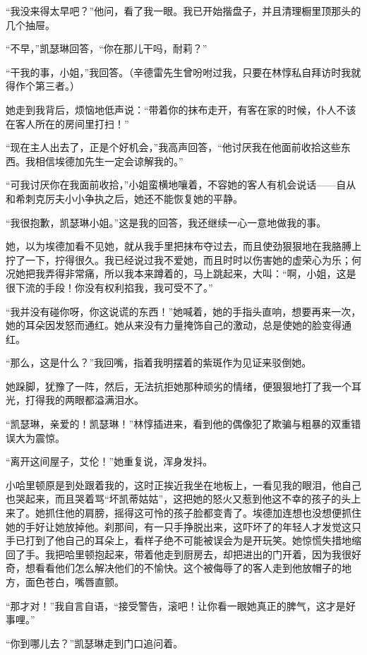 \par “我没来得太早吧？”他问，看了我一眼。我已开始揩盘子，并且清理橱里顶那头的几个抽屉。
\par “不早，”凯瑟琳回答，“你在那儿干吗，耐莉？”
\par “干我的事，小姐，”我回答。（辛德雷先生曾吩咐过我，只要在林惇私自拜访时我就得作个第三者。）
\par 她走到我背后，烦恼地低声说：“带着你的抹布走开，有客在家的时候，仆人不该在客人所在的房间里打扫！”
\par “现在主人出去了，正是个好机会，”我高声回答，“他讨厌我在他面前收拾这些东西。我相信埃德加先生一定会谅解我的。”
\par “可我讨厌你在我面前收拾，”小姐蛮横地嚷着，不容她的客人有机会说话——自从和希刺克厉夫小小争执之后，她还不能恢复她的平静。
\par “我很抱歉，凯瑟琳小姐。”这是我的回答，我还继续一心一意地做我的事。
\par 她，以为埃德加看不见她，就从我手里把抹布夺过去，而且使劲狠狠地在我胳膊上拧了一下，拧得很久。我已经说过我不爱她，而且时时以伤害她的虚荣心为乐；何况她把我弄得非常痛，所以我本来蹲着的，马上跳起来，大叫：“啊，小姐，这是很下流的手段！你没有权利掐我，我可受不了。”
\par “我并没有碰你呀，你这说谎的东西！”她喊着，她的手指头直响，想要再来一次，她的耳朵因发怒而通红。她从来没有力量掩饰自己的激动，总是使她的脸变得通红。
\par “那么，这是什么？”我回嘴，指着我明摆着的紫斑作为见证来驳倒她。
\par 她跺脚，犹豫了一阵，然后，无法抗拒她那种顽劣的情绪，便狠狠地打了我一个耳光，打得我的两眼都溢满泪水。
\par “凯瑟琳，亲爱的！凯瑟琳！”林惇插进来，看到他的偶像犯了欺骗与粗暴的双重错误大为震惊。
\par “离开这间屋子，艾伦！”她重复说，浑身发抖。
\par 小哈里顿原是到处跟着我的，这时正挨近我坐在地板上，一看见我的眼泪，他自己也哭起来，而且哭着骂“坏凯蒂姑姑”，这把她的怒火又惹到他这不幸的孩子的头上来了。她抓住他的肩膀，摇得这可怜的孩子脸都变青了。埃德加连想也没想便抓住她的手好让她放掉他。刹那间，有一只手挣脱出来，这吓坏了的年轻人才发觉这只手已打到了他自己的耳朵上，看样子绝不可能被误会为是开玩笑。她惊慌失措地缩回了手。我把哈里顿抱起来，带着他走到厨房去，却把进出的门开着，因为我很好奇，想看看他们怎么解决他们的不愉快。这个被侮辱了的客人走到他放帽子的地方，面色苍白，嘴唇直颤。
\par “那才对！”我自言自语，“接受警告，滚吧！让你看一眼她真正的脾气，这才是好事哩。”
\par “你到哪儿去？”凯瑟琳走到门口追问着。
